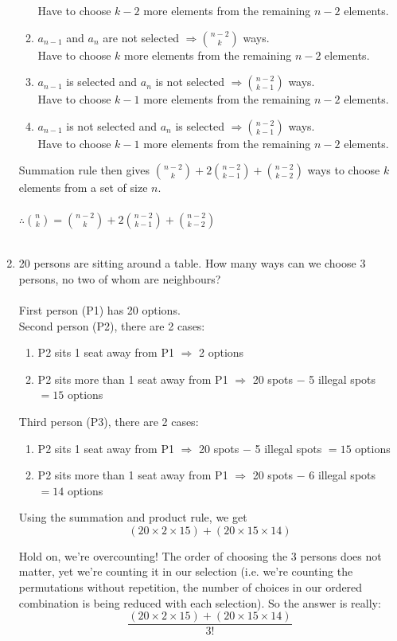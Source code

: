 \documentclass[10pt,a4paper,final]{article}
\begin{document}
\begin{enumerate}
\begin{enumerate}
Have to choose $k-2$ more elements from the remaining $n-2$ elements.
\item $a_{n-1}$ and $a_n$ are not selected $\Rightarrow \binom{n-2}{k}$ ways.\\
Have to choose $k$ more elements from the remaining $n-2$ elements.
\item $a_{n-1}$ is selected and $a_n$ is not selected $\Rightarrow \binom{n-2}{k-1}$ ways.\\
Have to choose $k-1$ more elements from the remaining $n-2$ elements.
\item $a_{n-1}$ is not selected and $a_n$ is selected $\Rightarrow \binom{n-2}{k-1}$ ways.\\
Have to choose $k-1$ more elements from the remaining $n-2$ elements.
\end{enumerate}
Summation rule then gives
$\binom{n-2}{k} + 2 \binom{n-2}{k-1} + \binom{n-2}{k-2}$ ways to choose $k$ elements
from a set of size $n$.\\ \\
$\therefore \binom{n}{k} = \binom{n-2}{k} + 2 \binom{n-2}{k-1} + \binom{n-2}{k-2}$\\
\\
\item %
20 persons are sitting around a table.
How many ways can we choose 3 persons, no two of whom are neighbours?\\
\\
First person (P1) has 20 options. \\
Second person (P2), there are 2 cases:
\begin{enumerate}
\item P2 sits 1 seat away from P1 $\Rightarrow$ 2 options
\item P2 sits more than 1 seat away from P1 $\Rightarrow$ 20 spots $-$ 5 illegal spots $=15$ options
\end{enumerate}
Third person (P3), there are 2 cases:
\begin{enumerate}
\item P2 sits 1 seat away from P1 $\Rightarrow$ 20 spots $-$ 5 illegal spots $=15$ options
\item P2 sits more than 1 seat away from P1 $\Rightarrow$ 20 spots $-$ 6 illegal spots $=14$ options
\end{enumerate}

Using the summation and product rule, we get
\begin{equation*}
(20 \times 2 \times 15)+(20 \times 15 \times 14)
\end{equation*}

Hold on, we're overcounting! The order of choosing the 3 persons does not matter,
yet we're counting it in our selection (i.e. we're counting the permutations without repetition,
the number of choices in our ordered combination is being reduced with each selection).
So the answer is really:
\begin{equation*}
\frac{(20 \times 2 \times 15)+(20 \times 15 \times 14)}{3!}
\end{equation*}

\end{enumerate}
\end{document}
